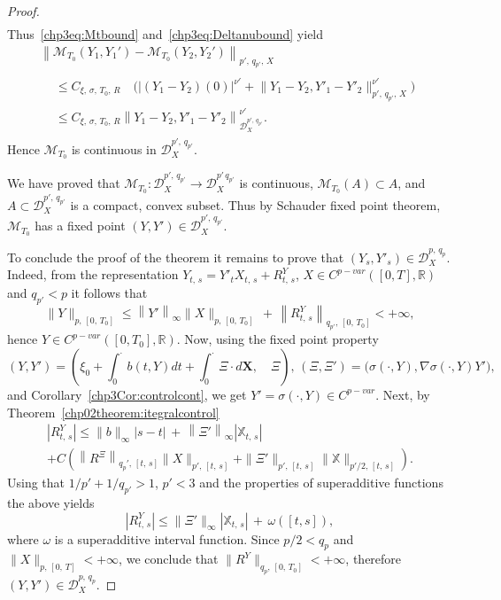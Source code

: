 \documentclass[AHL,Unicode,longabstracts,published]{cedram}
\newcommand{\scrD}{\mathscr{D}}
\newcommand{\bbX}{\mathbb{X}}
\newcommand{\calM}{\mathcal{M}}
\newcommand{\Rr}{{\mathbb{R}}}
\begin{document}
\begin{proof}
\begin{multline*}
\end{multline*}
Thus~\eqref{chp3eq:Mtbound} and~\eqref{chp3eq:Deltanubound} yield
\begin{multline*}
\left\|\calM_{T_0}\left(Y_1,Y_1'\right)-\calM_{T_0}\left(Y_2,Y_2'\right)\right\|_{p',\, q_{p'}, \,X}\\
\begin{aligned}
&\leq C_{\xi,\,\sigma,\,T_0,\,R}\quad \Big(\left|\left(Y_1-Y_2\right)(0)\right|^{\nu'}+\big\|Y_1-Y_2,Y'_1-Y'_2\big\|^{\nu'}_{p',\,q_{p'}, \,X}\Big)\\
&\leq C_{\xi,\,\sigma,\,T_0,\,R} \left\|Y_1-Y_2,Y'_1-Y'_2\right\|^{\nu'}_{\scrD^{p', \,q_{p'}}_ X}.
\end{aligned}
\end{multline*}
Hence $\calM_{T_0}$ is continuous in $\scrD^{p',\,q_{p'}}_{X}$.

We have proved that $\calM_{T_0}\colon \scrD^{p', \,q_{p'}}_{X}\to \scrD^{p'\,q_{p'}}_{X}$ is continuous, $\calM_{T_0}(A)\subset A$, and $A\subset \scrD^{p',\,q_{p'}}_{X}$ is a compact, convex subset. Thus by Schauder fixed point theorem, $\calM_{T_0}$ has a fixed point $(Y,Y')\in\scrD^{p',\,q_{p'}}_{X}$.

To conclude the proof of the theorem it remains to prove that $(Y_s,Y'_s)\in\scrD^{p,\,q_p}_{X}$. Indeed, from the representation $Y_{t,\,s}=Y'_tX_{t,\,s}+R^Y_{t,\,s}$, $X\in C^{p-var}([0,T],\Rr)$ and $q_{p'}<p$ it follows that
\[
\|Y\|_{p,\,\left[0,\,T_0\right]}\leq \left\|Y'\right\|_{\infty} \|X\|_{p,\,\left[0,\,T_0\right]}\,+\,\left\|R^Y_{t,\,s}\right\|_{q_{p'},\,\left[0,\,T_0\right]}<+\infty,
\]
hence $Y\in C^{p-var}([0,T_0],\Rr)$. Now, using the fixed point property
\[
\left(Y,Y'\right)=\left(\xi_0+\int_0^{\cdot} b(t, Y)dt+\int_0^{\cdot} \Xi\cdot d\bm{X},\quad \Xi\right),\, \left(\Xi,\Xi'\right)=\big(\sigma(\cdot,Y), \nabla \sigma(\cdot,Y) Y'\big),
\]
and Corollary~\ref{chp3Cor:controlcont}, we get $Y'=\sigma(\cdot, Y)\in C^{p-var}$. Next, by Theorem~\ref{chp02theorem:itegralcontrol}
\begin{multline*}
\left|R^Y_{t,\,s}\right|
\leq \|b\|_{\infty}|s-t|\,+\,\left\|\Xi'\right\|_{\infty}\left|\bbX_{t,\,s}\right|\\
+ C\left(\left\|{R}^{\Xi}\right\|_{q_p',\,[t,\,s]}\|X\|_{p',\,[t,\,s]}+\|\Xi'\|_{p',\,[t,\,s]}\|{\bbX}\|_{p'/2,\,[t,\,s]}\right).
\end{multline*}
Using that $1/p'+1/q_{p'}>1$, $p'<3$ and the properties of superadditive functions the above yields
\[
\left|R^Y_{t,\,s}\right|\leq \|\Xi'\|_{\infty}|\bbX_{t,\,s}|\,+\,\omega([t,s]),
\]
where $\omega$ is a superadditive interval function. Since $p/2< q_{p}$ and $\|X\|_{p,\,[0,\,T]}<+\infty$, we conclude that $\|R^Y\|_{q_p,\, [0,\,T_0]}<+\infty$, therefore $(Y,Y')\in\scrD^{p,\,q_p}_{X }.$
\end{proof}
\end{document}
